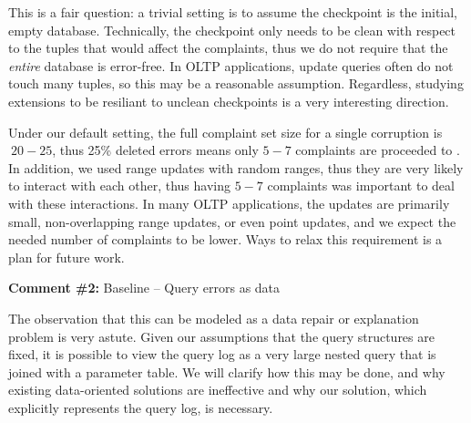 \begin{quote}
\end{quote}
This is a fair question: a trivial setting is to assume the checkpoint is the initial, empty database.
Technically, the checkpoint only needs to be clean with respect to the tuples that would affect the complaints, thus we do not require that the {\it entire} database is error-free.  In OLTP applications, update queries often do not touch many tuples, so this may be a reasonable assumption.  
Regardless, studying extensions to be resiliant to unclean checkpoints is a very interesting direction.

\begin{quote}
\end{quote}

Under our default setting, the full complaint set size for a single corruption is $~20-25$, thus 
25\% deleted errors means only $5-7$ complaints are proceeded to \sys. 
In addition, we used range updates with random ranges, thus they are very likely to interact with each other, thus having $5-7$ complaints was important to deal with these interactions.  In many OLTP applications, the updates are primarily small, non-overlapping range updates, or even point updates, and we expect the needed number of complaints to be lower.  Ways to relax this requirement is a plan for future work.


\comskip

\noindent
\textbf{Comment \#2:} Baseline -- Query errors as data
\begin{quote}
\end{quote}

The observation that this can be modeled as a data repair or explanation problem is very astute.  
Given our assumptions that the query structures are fixed, it is possible to view the query log
as a very large nested query that is joined with a parameter table.  We will clarify how this may be
done, and why existing data-oriented solutions are ineffective and why our solution, which explicitly
represents the query log, is necessary.



